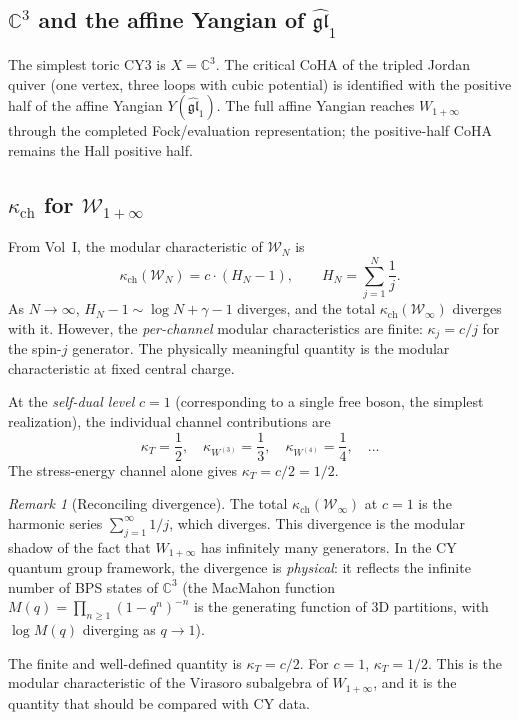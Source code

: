 \documentclass[11pt]{article}
\theoremstyle{definition}
\theoremstyle{remark}
\newtheorem{remark}[theorem]{Remark}
\begin{document}
\subsection{$\mathbb{C}^3$ and the affine Yangian of $\widehat{\mathfrak{gl}}_1$}

The simplest toric CY3 is $X = \mathbb{C}^3$. The critical CoHA of the
tripled Jordan quiver (one vertex, three loops with cubic potential) is
identified with the positive half of the affine Yangian
$Y(\widehat{\mathfrak{gl}}_1)$. The full affine Yangian reaches
$W_{1+\infty}$ through the completed Fock/evaluation representation; the
positive-half CoHA remains the Hall positive half.

\subsection{$\kappa_{\mathrm{ch}}$ for $\mathcal{W}_{1+\infty}$}

From Vol~I, the modular characteristic of $\mathcal{W}_N$ is
\begin{equation}\label{eq:chiral-characteristic-wn}
 \kappa_{\mathrm{ch}}(\mathcal{W}_N) = c \cdot (H_N - 1),
 \qquad H_N = \sum_{j=1}^N \frac{1}{j}.
\end{equation}
As $N \to \infty$, $H_N - 1 \sim \log N + \gamma - 1$ diverges, and
the total $\kappa_{\mathrm{ch}}(\mathcal{W}_\infty)$ diverges with it. However,
the \emph{per-channel} modular characteristics are finite:
$\kappa_j = c/j$ for the spin-$j$ generator. The physically
meaningful quantity is the modular characteristic at fixed central
charge.

At the \emph{self-dual level} $c = 1$ (corresponding to a single free
boson, the simplest realization), the individual channel contributions
are
\begin{equation}\label{eq:chiral-channel-c1}
 \kappa_T = \frac{1}{2}, \quad
 \kappa_{W^{(3)}} = \frac{1}{3}, \quad
 \kappa_{W^{(4)}} = \frac{1}{4}, \quad \ldots
\end{equation}
The stress-energy channel alone gives $\kappa_T = c/2 = 1/2$.

\begin{remark}[Reconciling divergence]
\label{rem:winfty-divergence}
The total $\kappa_{\mathrm{ch}}(\mathcal{W}_\infty)$ at $c = 1$ is the harmonic series
$\sum_{j=1}^\infty 1/j$, which diverges. This divergence is the modular
shadow of the fact that $W_{1+\infty}$ has infinitely many generators.
In the CY quantum group framework, the divergence is \emph{physical}: it
reflects the infinite number of BPS states of $\mathbb{C}^3$ (the
MacMahon function $M(q) = \prod_{n \geq 1} (1-q^n)^{-n}$ is the
generating function of 3D partitions, with $\log M(q)$ diverging as
$q \to 1$).

The finite and well-defined quantity is $\kappa_T = c/2$. For
$c = 1$, $\kappa_T = 1/2$. This is the modular characteristic of
the Virasoro subalgebra of $W_{1+\infty}$, and it is the quantity
that should be compared with CY data.
\end{remark}
\end{document}
